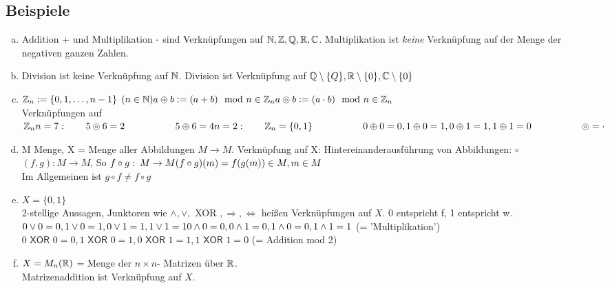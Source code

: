 \subsection{Beispiele}\label{sec:1.2}
\begin{enumerate}[a)]
\item Addition $+$ und Multiplikation $\cdot$ sind Verknüpfungen auf $\mathbb{N}, \mathbb{Z}, \mathbb{Q}, \mathbb{R}, \mathbb{C}$.
Multiplikation ist \emph{keine} Verknüpfung auf der Menge der negativen ganzen Zahlen.
\item Division ist keine Verknüpfung auf $\mathbb{N}$. Division ist Verknüpfung auf $\mathbb{Q} \setminus \{Q\}, \mathbb{R} \setminus \{0\}, \mathbb{C} \setminus \{0\}$
\item $\mathbb{Z}_n : = \{ 0,1,\ldots,n-1 \}$ \hfill $(n \in \mathbb{N})\\
a \oplus b : = (a + b) \mod n \in \mathbb{Z}_n\\
a \circledcirc b := (a \cdot b) \mod n \in \mathbb{Z}_n$\\
Verknüpfungen auf $\mathbb{Z}_n\\
n = 7:\qquad 5 \circledcirc 6 = 2\\
\phantom{n = 7::}\qquad 5 \oplus 6 = 4\\
n = 2:\qquad \mathbb{Z}_n = \{0,1\}\\
\phantom{n = 2::}\qquad0 \oplus 0 = 0, 1 \oplus 0 = 1,0 \oplus 1 = 1, 1 \oplus 1 = 0\\
\phantom{n = 2::}\qquad\circledcirc = \cdot$
\item M Menge, X = Menge aller Abbildungen $M \longrightarrow M$. Verknüpfung auf X: Hintereinanderausführung von Abbildungen: $\circ$\\
$(f, g): M \longrightarrow M$, So $f\circ g:\:M \to M\\
(f \circ g)(m) = f(g(m)) \in M, m \in M$\\
Im Allgemeinen ist $g \circ f \ne f \circ g$
\item $X = \{0,1\}$\\
2-stellige Aussagen, Junktoren wie $\land,\lor,$\textsf{ XOR }$,\Rightarrow,\Leftrightarrow$ hei\ss en Verknüpfungen auf $X$.
0 entspricht f, 1 entspricht w.\\
$0 \lor 0 = 0, 1 \lor 0 = 1, 0 \lor 1 = 1, 1 \lor 1 = 1\\
0 \land 0 = 0, 0 \land 1 = 0, 1 \land 0 = 0, 1 \land 1 =1$ (= 'Multiplikation')\\
$0 \textsf{ XOR } 0 = 0, 1 \textsf{ XOR } 0 = 1, 0 \textsf{ XOR } 1 = 1, 1 \textsf{ XOR } 1 = 0$ (= Addition mod 2)
\item $X = M_n(\mathbb{R})$ = Menge der  $n \times n$- Matrizen über $\mathbb{R}$.\\ Matrizenaddition ist Verknüpfung auf $X$.\\

\end{enumerate}
